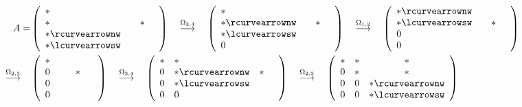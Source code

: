 \begin{align*}
  A= &
       \left(\begin{array}{lccc}
               *~ &&&\\
               * &&* \\
               * \rcurvearrownw \\ * \lcurvearrowsw
             \end{array}\right)
  \quad \overset{\Omega_{3,4}}{\longrightarrow} \quad
  \left(\begin{array}{lccc}
          *~ &&&\\
          * \rcurvearrownw && *\\
          * \lcurvearrowsw \\
          0
        \end{array}\right)
  \quad \overset{\Omega_{1,2}}{\longrightarrow} \quad
  \left(\begin{array}{lccc}
          * \rcurvearrownw\\
          * \lcurvearrowsw && *& \\
          0 \\
          0
        \end{array}\right)\\
  \quad \overset{\Omega_{2,3}}{\longrightarrow} \quad
     &\left(\begin{array}{lccc}
              *~~ \\
              0 && *&~ \\
              0 \\
              0
            \end{array}\right)
  \quad \overset{\Omega_{3,4}}{\longrightarrow} \quad	
  \left(\begin{array}{clcc}
          * & *\\
          0 & *  \rcurvearrownw  & *& \\
          0 & * \lcurvearrowsw \\
          0 & 0
        \end{array}\right)
              \quad \overset{\Omega_{2,3}}{\longrightarrow} \quad	
              \left(\begin{array}{cccl}
                      * & *  & * \\
                      0 & *  & * \\ 
                      0 & 0 & * \rcurvearrownw\\
                      0 & 0 & *  \lcurvearrowsw 
                    \end{array}\right) \\

\end{align*}
